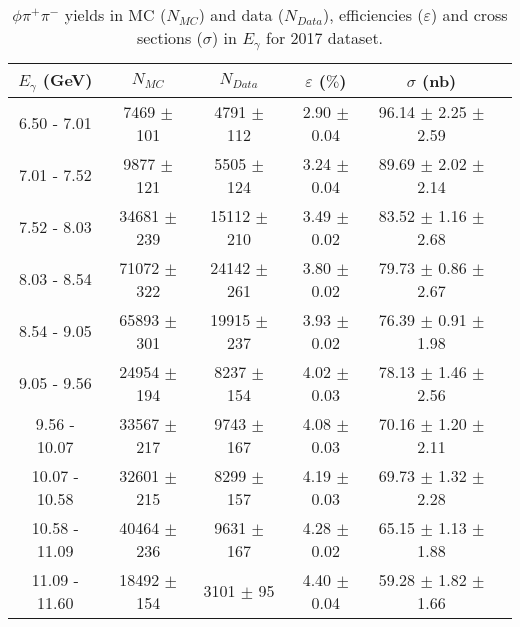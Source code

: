 \begin{center}
\begin{table}[H]
    \caption{$\phi \pi^{+}\pi^{-}$ yields in MC ($N_{MC}$) and data ($N_{Data}$), efficiencies ($\varepsilon$) and cross sections ($\sigma$) in $E_{\gamma}$ for 2017 dataset.}
    \label{tab.y2175.xsec_ul.phi2pi.2.1}
    \begin{tabular}{|c|c|c|c|c|c|}
    \hline
    $E_{\gamma}$ (GeV) & $N_{MC}$ & $N_{Data}$ & $\varepsilon$ ($\%$) & $\sigma$ (nb) \\ 
    \hline
    6.50 - 7.01 & 7469 $\pm$ 101 & 4791 $\pm$ 112 & 2.90 $\pm$ 0.04 & 96.14 $\pm$ 2.25 $\pm$ 2.59 \\ 
    7.01 - 7.52 & 9877 $\pm$ 121 & 5505 $\pm$ 124 & 3.24 $\pm$ 0.04 & 89.69 $\pm$ 2.02 $\pm$ 2.14 \\ 
    7.52 - 8.03 & 34681 $\pm$ 239 & 15112 $\pm$ 210 & 3.49 $\pm$ 0.02 & 83.52 $\pm$ 1.16 $\pm$ 2.68 \\ 
    8.03 - 8.54 & 71072 $\pm$ 322 & 24142 $\pm$ 261 & 3.80 $\pm$ 0.02 & 79.73 $\pm$ 0.86 $\pm$ 2.67 \\ 
    8.54 - 9.05 & 65893 $\pm$ 301 & 19915 $\pm$ 237 & 3.93 $\pm$ 0.02 & 76.39 $\pm$ 0.91 $\pm$ 1.98 \\ 
    9.05 - 9.56 & 24954 $\pm$ 194 & 8237 $\pm$ 154 & 4.02 $\pm$ 0.03 & 78.13 $\pm$ 1.46 $\pm$ 2.56 \\ 
    9.56 - 10.07 & 33567 $\pm$ 217 & 9743 $\pm$ 167 & 4.08 $\pm$ 0.03 & 70.16 $\pm$ 1.20 $\pm$ 2.11 \\ 
    10.07 - 10.58 & 32601 $\pm$ 215 & 8299 $\pm$ 157 & 4.19 $\pm$ 0.03 & 69.73 $\pm$ 1.32 $\pm$ 2.28 \\ 
    10.58 - 11.09 & 40464 $\pm$ 236 & 9631 $\pm$ 167 & 4.28 $\pm$ 0.02 & 65.15 $\pm$ 1.13 $\pm$ 1.88 \\ 
    11.09 - 11.60 & 18492 $\pm$ 154 & 3101 $\pm$ 95 & 4.40 $\pm$ 0.04 & 59.28 $\pm$ 1.82 $\pm$ 1.66 \\ 
   \hline
\end{tabular}
\end{table}
\null
\vfill
\end{center}

